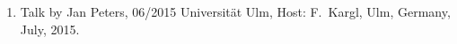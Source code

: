 \begin{enumerate}
\item Talk by Jan Peters, 06/2015 Universit\"at Ulm, Host: F.~Kargl, Ulm, Germany, July, 2015.
\end{enumerate}


